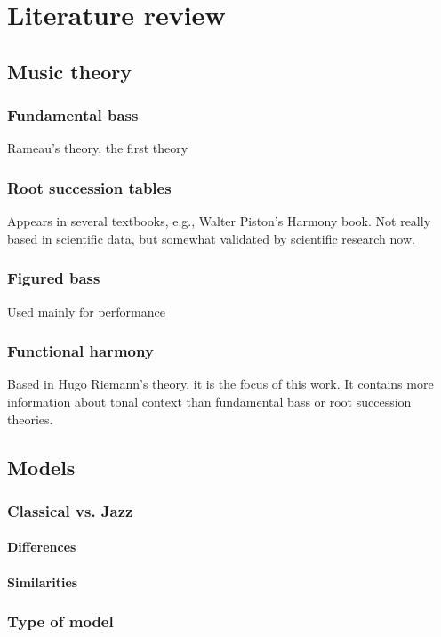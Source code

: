 \normallinespacing

\chapter{Literature review}

\section{Music theory}
  \subsection{Fundamental bass}
  Rameau's theory, the first theory
  \subsection{Root succession tables}
  Appears in several textbooks, e.g., Walter Piston's Harmony book. Not really based in scientific data, but somewhat validated by scientific research now.
  \subsection{Figured bass}
  Used mainly for performance
  \subsection{Functional harmony}
  Based in Hugo Riemann's theory, it is the focus of this work. It contains more information about tonal context than fundamental bass or root succession theories.

\section{Models}
  \subsection{Classical vs. Jazz}
    \subsubsection{Differences}
    \subsubsection{Similarities}
  \subsection{Type of model}

